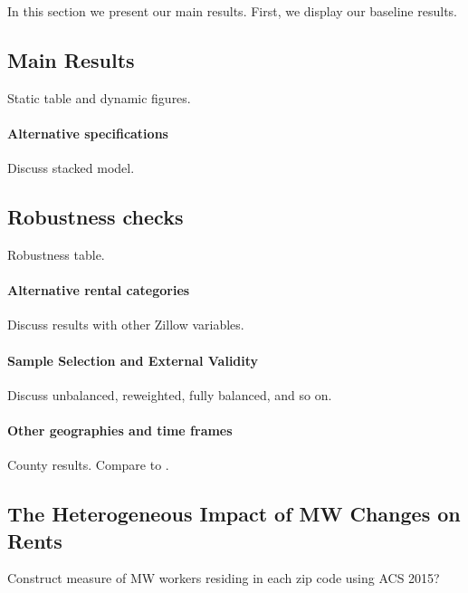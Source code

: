 
In this section we present our main results. First, we display our baseline results.   

\subsection{Main Results}\label{sec:main_results}

Static table and dynamic figures.

\paragraph{Alternative specifications}

Discuss stacked model.

\subsection{Robustness checks}\label{sec:robustness_results}

Robustness table.

\paragraph{Alternative rental categories}

Discuss results with other Zillow variables.

\paragraph{Sample Selection and External Validity}

Discuss unbalanced, reweighted, fully balanced, and so on.

\paragraph{Other geographies and time frames}

County results.
Compare to \textcite{Yamagishi2019}.

\subsection{The Heterogeneous Impact of MW Changes on Rents}
\label{sec:heterogeneity_results}

Construct measure of MW workers residing in each zip code using ACS 2015?

